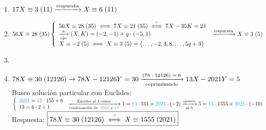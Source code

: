 \documentclass[12pt,a4paper, spanish]{article}
\begin{document}
\begin{enumerate}[label=\roman*)]
	\item $\congruencia{17X}{3}{11} \flecha{respuesta} \congruencia{X}{6}{11} $\\

	\item $\congruencia{56X}{28}{35}\\
		      \llave{l}{
			      \congruencia{56X}{28}{35} \sisolosi
			      \congruencia{7X}{21}{35} \stackrel{\red{?}}\sisolosi
			      7X - 35K = 21\\
			      \flecha{a}[ojo] (X,K) = (-2,-1) + q \cdot (-5, 1)\\
			      \congruencia{X}{-2}{5} \sisolosi \congruencia{X}{3}{5} = \set{\dots, -2, 3, 8, \dots, 5q+3}
		      }\\
		      \flecha{respuesta} \congruencia{X}{3}{5} $

      \item
      \item $\congruencia{78X}{30}{12126}  \to 78X - 12126 Y = 30 \flecha{$(78:12126) = 6$}[coprimizando] 13X - 2021 Y = 5$\\
        Busco solución particular con Euclides:\\
        $\llave{l}{
          \blue{2021} =  \blue{13} \cdot 155 + 6\\
         13 =  6 \cdot 2 + 1
       }\flecha{Escribo al 1 como}[combinación de \blue{2021} y\blue{13}]
       1 = \blue{13} \cdot 311 + \blue{2021} \cdot (-2) 
       \flecha{quiero}[al 5]
       5 =  \blue{13}\cdot 1555 + \blue{2021} \cdot (-10)$\\

       Respuesta: $\boxed{78X \equiv 30 \;(12126)
       \stackrel{{\color{red}\text{?}}} {\iff} X \equiv 1555 \;(2021)}$

       
\end{enumerate}

\separadorCorto
\end{document}
